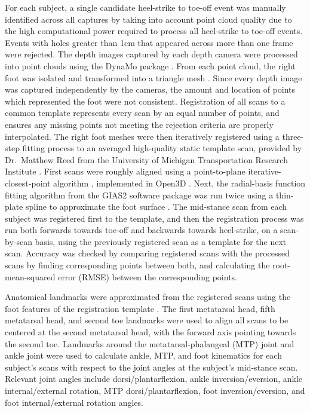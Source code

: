\documentclass[defaultstyle,11pt]{comps}
\begin{document}
For each subject, a single candidate heel-strike to toe-off event was manually identified across all captures by taking into account point cloud quality due to the high computational power required to process all heel-strike to toe-off events.
Events with holes greater than 1cm that appeared across more than one frame were rejected.
The depth images captured by each depth camera were processed into point clouds using the DynaMo package \citep{Boppana2019}.
From each point cloud, the right foot was isolated and transformed into a triangle mesh \citep{Rusu2011, Fischler1981, Bernardini1999, Zhou2018}.
Since every depth image was captured independently by the cameras, the amount and location of points which represented the foot were not consistent.
Registration of all scans to a common template represents every scan by an equal number of points, and ensures any missing points not meeting the rejection criteria are properly interpolated.
The right foot meshes were then iteratively registered using a three-step fitting process to an averaged high-quality static template scan, provided by Dr.~Matthew Reed from the University of Michigan Transportation Research Institute \citep{Reed2013}.
First scans were roughly aligned using a point-to-plane iterative-closest-point algorithm \citep{Chen1992}, implemented in Open3D \citep{Zhou2018}.
Next, the radial-basis function fitting algorithm from the GIAS2 software package \citep{Zhang2016} was run twice using a thin-plate spline to approximate the foot surface \citep{Park2015a, Kim2016}.
The mid-stance scan from each subject was registered first to the template, and then the registration process was run both forwards towards toe-off and backwards towards heel-strike, on a scan-by-scan basis, using the previously registered scan as a template for the next scan.
Accuracy was checked by comparing registered scans with the processed scans by finding corresponding points between both, and calculating the root-mean-squared error (RMSE) between the corresponding points.

Anatomical landmarks were approximated from the registered scans using the foot features of the registration template \citep{VandenHerrewegen2014b}.
The first metatarsal head, fifth metatarsal head, and second toe landmarks were used to align all scans to be centered at the second metatarsal head, with the forward axis pointing towards the second toe.
Landmarks around the metatarsal-phalangeal (MTP) joint and ankle joint were used to calculate ankle, MTP, and foot kinematics for each subject's scans with respect to the joint angles at the subject's mid-stance scan.
Relevant joint angles include dorsi/plantarflexion, ankle inversion/eversion, ankle internal/external rotation, MTP dorsi/plantarflexion, foot inversion/eversion, and foot internal/external rotation angles.
\end{document}
